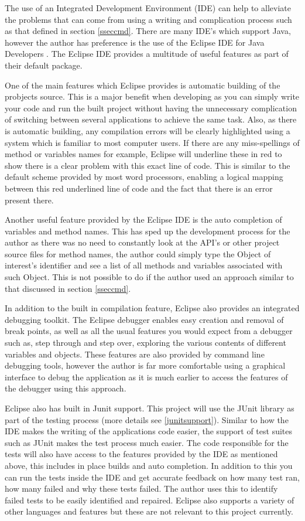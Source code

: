 The use of an Integrated Development Environment (IDE) can help to alleviate the problems that can come from using a writing and complication process such as that defined in section \ref{sseccmd}. There are many IDE's which support Java, however the author has preference is the use of the Eclipse IDE for Java Developers \cite{eclipse:IDE}. The Eclipse IDE provides a multitude of useful features as part of their default package. 

One of the main features which Eclipse provides is automatic building of the probjects source. This is a major benefit when developing as you can simply write your code and run the built project without having the unnecessary complication of switching between several applications to achieve the same task. Also, as there is automatic building, any compilation errors will be clearly highlighted using a system which is familiar to most computer users. If there are any miss-spellings of method or variables names for example, Eclipse will underline these in red to show there is a clear problem with this exact line of code. This is similar to the default scheme provided by most word processors, enabling a logical mapping between this red underlined line of code and the fact that there is an error present there.

Another useful feature provided by the Eclipse IDE is the auto completion of variables and method names. This has sped up the development process for the author as there was no need to constantly look at the API's or other project source files for method names, the author could simply type the Object of interest's identifier and see a list of all methods and variables associated with such Object. This is not possible to do if the author used an approach similar to that discussed in section \ref{sseccmd}.

In addition to the built in compilation feature, Eclipse also provides an integrated debugging toolkit. The Eclipse debugger enables easy creation and removal of break points, as well as all the usual features you would expect from a debugger such as, step through and step over, exploring the various contents of different variables and objects. These features are also provided by command line debugging tools, however the author is far more comfortable using a graphical interface to debug the application as it is much earlier to access the features of the debugger using this approach.

Eclipse also has built in Junit support. This project will use the JUnit library as part of the testing process (more details see \ref{junitsupport}). Similar to how the IDE makes the writing of the applications code easier, the support of test suites such as JUnit makes the test process much easier. The code responsible for the tests will also have access to the features provided by the IDE as mentioned above, this includes in place builds and auto completion. In addition to this you can run the tests inside the IDE and get accurate feedback on how many test ran, how many failed and why these tests failed. The author uses this to identify failed tests to be easily identified and repaired. Eclipse also supports a variety of other languages and features but these are not relevant to this project currently.

